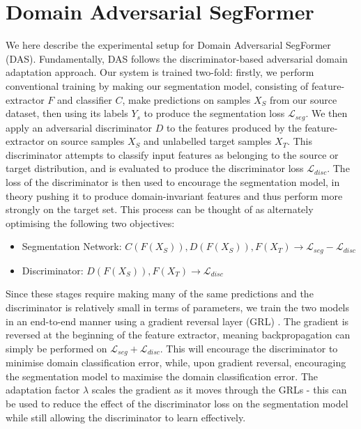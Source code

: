 \documentclass[a4paper,12pt]{report}
\begin{document}

\section{Domain Adversarial SegFormer}

We here describe the experimental setup for Domain Adversarial SegFormer (DAS). Fundamentally, DAS follows the discriminator-based adversarial domain adaptation approach. Our system is trained two-fold: firstly, we perform conventional training by making our segmentation model, consisting of feature-extractor $F$ and classifier $C$, make predictions on samples $X_S$ from our source dataset, then using its labels $Y_s$ to produce the segmentation loss $\mathcal{L}_{seg}$. We then apply an adversarial discriminator $D$ to the features produced by the feature-extractor on source samples $X_S$ and unlabelled target samples $X_T$. This discriminator attempts to classify input features as belonging to the source or target distribution, and is evaluated to produce the discriminator loss $\mathcal{L}_{disc}$. The loss of the discriminator is then used to encourage the segmentation model, in theory pushing it to produce domain-invariant features and thus perform more strongly on the target set. This process can be thought of as alternately optimising the following two objectives:

\begin{itemize}
    \item Segmentation Network: $C(F(X_S)), D(F(X_S)), F(X_T) \rightarrow \mathcal{L}_{seg} - \mathcal{L}_{disc} $
    \item Discriminator: $D(F(X_S)), F(X_T) \rightarrow \mathcal{L}_{disc}$ 
\end{itemize}

Since these stages require making many of the same predictions and the discriminator is relatively small in terms of parameters, we train the two models in an end-to-end manner using a gradient reversal layer (GRL) \cite{ganin_domain-adversarial_2016}. The gradient is reversed at the beginning of the feature extractor, meaning backpropagation can simply be performed on $\mathcal{L}_{seg} + \mathcal{L}_{disc}$. This will encourage the discriminator to minimise domain classification error, while, upon gradient reversal, encouraging the segmentation model to maximise the domain classification error. The adaptation factor $\lambda$ scales the gradient as it moves through the GRLs - this can be used to reduce the effect of the discriminator loss on the segmentation model while still allowing the discriminator to learn effectively. 
\end{document}
